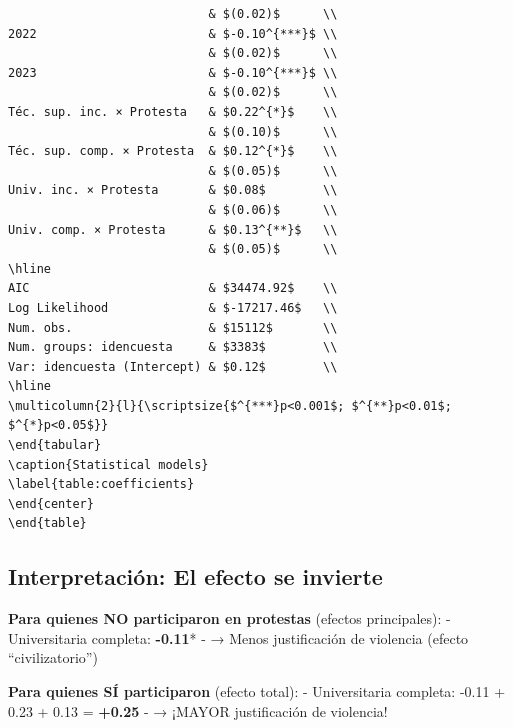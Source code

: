 \documentclass[
  12pt,
]{article}
\begin{document}
\begin{verbatim}
                            & $(0.02)$      \\
2022                        & $-0.10^{***}$ \\
                            & $(0.02)$      \\
2023                        & $-0.10^{***}$ \\
                            & $(0.02)$      \\
Téc. sup. inc. × Protesta   & $0.22^{*}$    \\
                            & $(0.10)$      \\
Téc. sup. comp. × Protesta  & $0.12^{*}$    \\
                            & $(0.05)$      \\
Univ. inc. × Protesta       & $0.08$        \\
                            & $(0.06)$      \\
Univ. comp. × Protesta      & $0.13^{**}$   \\
                            & $(0.05)$      \\
\hline
AIC                         & $34474.92$    \\
Log Likelihood              & $-17217.46$   \\
Num. obs.                   & $15112$       \\
Num. groups: idencuesta     & $3383$        \\
Var: idencuesta (Intercept) & $0.12$        \\
\hline
\multicolumn{2}{l}{\scriptsize{$^{***}p<0.001$; $^{**}p<0.01$; $^{*}p<0.05$}}
\end{tabular}
\caption{Statistical models}
\label{table:coefficients}
\end{center}
\end{table}
\end{verbatim}

\subsection{Interpretación: El efecto se
invierte}\label{interpretaciuxf3n-el-efecto-se-invierte}

\textbf{Para quienes NO participaron en protestas} (efectos
principales): - Universitaria completa: \textbf{-0.11}* - → Menos
justificación de violencia (efecto ``civilizatorio'')

\textbf{Para quienes SÍ participaron} (efecto total): - Universitaria
completa: -0.11 + 0.23 + 0.13 = \textbf{+0.25} - → ¡MAYOR justificación
de violencia!
\end{document}
